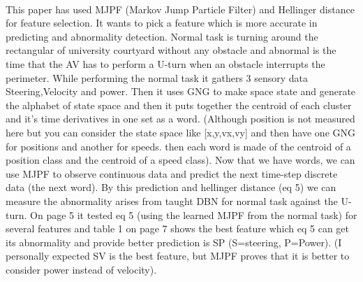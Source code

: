\documentclass{article}
\begin{document}
				\paragraph{\cite{kanapram-2019-dynamic-bayesian-approach-for-decision-making-in-ego-things}}
				This paper has used MJPF (Markov Jump Particle Filter) and Hellinger distance for feature selection. It wants to pick a feature which is more accurate in predicting and abnormality detection. 
				Normal task is turning around the rectangular of university courtyard without any obstacle and abnormal is the time that the AV has to perform a U-turn when an obstacle interrupts the perimeter. While performing the normal task it gathers 3 sensory data Steering,Velocity and power. Then it uses GNG to make space state and generate the alphabet of state space and then it puts together the centroid of each cluster and it's time derivatives in one set as a word. (Although position is not measured here but you can consider the state space like [x,y,vx,vy] and then have one GNG for positions and another for speeds. then each word is made of the centroid of a position class and the centroid of a speed class). Now that we have words, we can use MJPF to observe continuous data and predict the next time-step discrete data (the next word). By this prediction and hellinger distance (eq 5) we can measure the abnormality arises from taught DBN for normal task against the U-turn. On page 5 it tested eq 5 (using the learned MJPF from the normal task) for several features and table 1 on page 7 shows the best feature which eq 5 can get its abnormality and provide better prediction is SP (S=steering, P=Power). (I personally expected SV is the best feature, but MJPF proves that it is better to consider power instead of velocity).  
				
\end{document}
